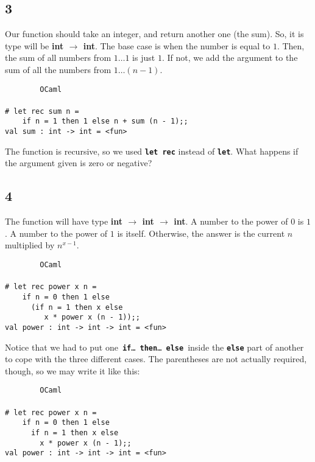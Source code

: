 \documentclass[]{book}
\newcommand{\pif}{\textbf{if}\xspace}
\newcommand{\pthen}{\textbf{then}\xspace}
\newcommand{\pelse}{\textbf{else}\xspace}
\newcommand{\smspace}{\vspace{4mm}}
\begin{document}
\subsection*{3}
Our function should take an integer, and return another one (the sum). So, it is type will be \textbf{\textsf{int $\rightarrow$ int}}. The base case is when the number is equal to $1$. Then, the sum of all numbers from $1\ldots 1$ is just $1$. If not, we add the argument to the sum of all the numbers from $1\ldots (n - 1)$.

\smspace
\noindent\verb!        OCaml!\\
\noindent\\
\noindent\verb!# let rec sum n =!\\
\noindent\verb!    if n = 1 then 1 else n + sum (n - 1);;!\\
\noindent\verb!val sum : int -> int = <fun>!
\smspace

\noindent The function is recursive, so we used \texttt{\textbf{let\!\! rec}} instead of \texttt{\textbf{let}}. What happens if the argument given is zero or negative?

\subsection*{4}
The function will have type \textsf{\textbf{int $\rightarrow$ int $\rightarrow$ int}}. A number to the power of $0$ is $1$. A number to the power of $1$ is itself. Otherwise, the answer is the current $n$ multiplied by $n^{x - 1}$.

\smspace
\noindent\verb!        OCaml!\\
\noindent\\
\noindent\verb!# let rec power x n =!\\
\noindent\verb!    if n = 0 then 1 else!\\
\noindent\verb!      (if n = 1 then x else!\\
\noindent\verb!         x * power x (n - 1));;!\\
\noindent\verb!val power : int -> int -> int = <fun>!
\smspace

\noindent Notice that we had to put one\, \texttt{\pif\ldots\ \pthen\ldots\ \pelse}\, inside the \texttt{\textbf{else}} part of another to cope with the three different cases. The parentheses are not actually required, though, so we may write it like this:

\smspace
\noindent\verb!        OCaml!\\
\noindent\\
\noindent\verb!# let rec power x n =!\\
\noindent\verb!    if n = 0 then 1 else!\\
\noindent\verb!      if n = 1 then x else!\\
\noindent\verb!        x * power x (n - 1);;!\\
\noindent\verb!val power : int -> int -> int = <fun>!
\smspace
\end{document}
